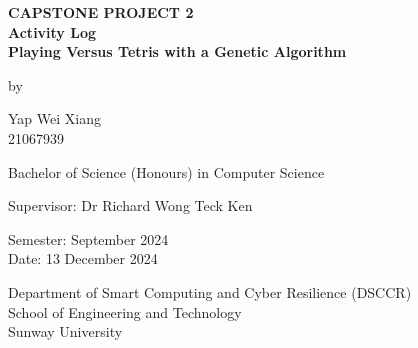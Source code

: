 \documentclass[a4paper, 12pt]{extreport}
\begin{document}
	
	\onehalfspacing
	
	\begin{titlepage}
		
		\centering
		
		\vspace{.5cm}
		
		\begin{center}
			\textbf{\large CAPSTONE PROJECT 2} \\
			\textbf{\large Activity Log} \\
			\vspace{1cm}
			\textbf{\large Playing Versus Tetris with a Genetic Algorithm}
			
			\vspace{1cm}
			
			by
			
			\vspace{1cm}
			
			\large Yap Wei Xiang \\
			21067939
			
			\vspace{1cm}
			
			Bachelor of Science (Honours) in Computer Science
			
			\vspace{1cm}
			
			\large Supervisor: Dr Richard Wong Teck Ken
			
			\vspace{1cm}
			
			\normalsize Semester: September 2024 \\
			Date: 13 December 2024
			
			\vfill
			
			Department of Smart Computing and Cyber Resilience (DSCCR)\\
			School of Engineering and Technology\\
			Sunway University
		\end{center}
		
	\end{titlepage}
	
\end{document}
